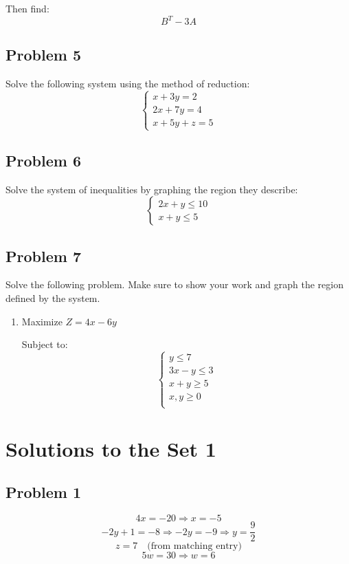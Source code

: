 \documentclass[12pt]{article}
\begin{document}
Then find:
\[
B^{T} - 3A
\]

\subsection*{Problem 5}
Solve the following system using the method of reduction:
\[
\begin{cases}
x + 3y = 2 \\
2x + 7y = 4 \\
x + 5y + z = 5
\end{cases}
\]

\subsection*{Problem 6}
Solve the system of inequalities by graphing the region they describe:
\[
\begin{cases}
2x + y \leq 10 \\
x + y \leq 5
\end{cases}
\]

\subsection*{Problem 7}
Solve the following problem. Make sure to show your work and graph the region defined by the system.

\begin{enumerate}[label=(\alph*)]
    \item Maximize \( Z = 4x - 6y \)

    Subject to:
    \[
    \begin{cases}
    y \leq 7 \\
    3x - y \leq 3 \\
    x + y \geq 5 \\
    x,y \geq 0 \\
    \end{cases}
    \]
\end{enumerate}

\newpage
\section*{Solutions to the Set 1}
\subsection*{Problem 1}
\[
4x = -20 \Rightarrow x = -5
\]
\[
-2y + 1 = -8 \Rightarrow -2y = -9 \Rightarrow y = \dfrac{9}{2}
\]
\[
z = 7 \quad \text{(from matching entry)}
\]
\[
5w = 30 \Rightarrow w = 6
\]
\end{document}
